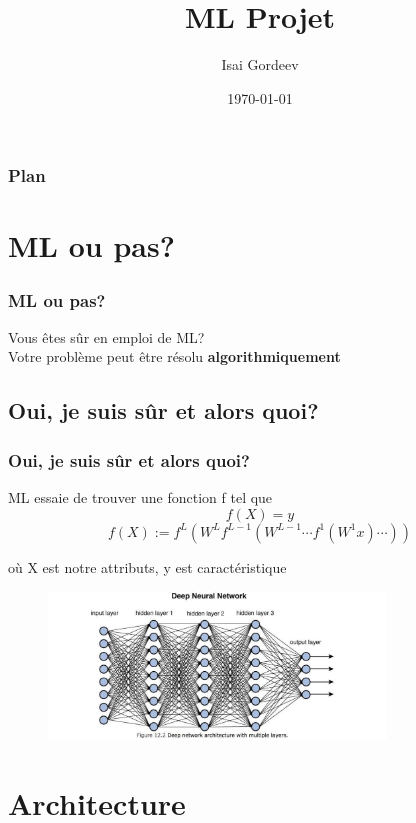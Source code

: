 \documentclass{beamer}
\title[ML]{ML Projet}
\author{Isai Gordeev}
\institute{École Polytechnique}
\date{\today}
\begin{document}
	
	\begin{frame}
		\titlepage
	\end{frame}
	
	\begin{frame}
		\frametitle{Plan}
			\tableofcontents
	
	\end{frame}


	\section{ML ou pas?}
	
	
	\begin{frame}
		\frametitle{ML ou pas?}
		\begin{center}
			Vous êtes sûr en emploi de ML?\\
			Votre problème peut être résolu \textbf{algorithmiquement}
		\end{center}
		
	\end{frame}

	\subsection{Oui, je suis sûr et alors quoi?}
		\begin{frame}
		\frametitle{Oui, je suis sûr et alors quoi?}
		\centering
		ML essaie de trouver une fonction f tel que
		$$f(X) = y$$
		$$ {\displaystyle f(X):=f^{L}(W^{L}f^{L-1}(W^{L-1}\cdots f^{1}(W^{1}x)\cdots ))} $$
		
		où X est notre attributs, y est caractéristique
		
		\begin{figure}
			\includegraphics[width=0.8\textwidth]{neuron}
			\label{fig:example}
		\end{figure}
		
	\end{frame}


	\section{Architecture}
	
\end{document}
